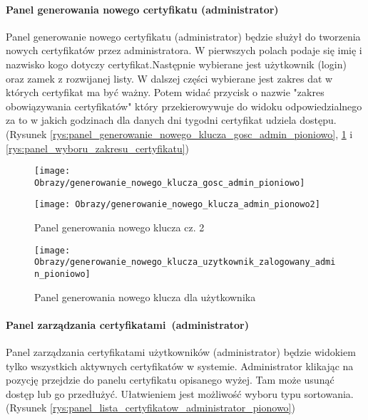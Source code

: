 	\paragraph*{Panel generowania nowego certyfikatu (administrator)}
	Panel generowanie nowego certyfikatu (administrator) będzie służył do tworzenia nowych certyfikatów przez administratora. W pierwszych polach podaje się imię i nazwisko kogo dotyczy certyfikat.Następnie wybierane jest użytkownik (login) oraz zamek z rozwijanej listy. W dalszej części wybierane jest zakres dat w których certyfikat ma być ważny. Potem widać przycisk o nazwie "zakres obowiązywania certyfikatów" który przekierowywuje do widoku odpowiedzialnego za to w jakich godzinach dla danych dni tygodni certyfikat udziela dostępu. (Rysunek \ref{rys:panel_generowanie_nowego_klucza_gosc_admin_pioniowo}, \ref{rys:panel_generowanie_nowego_klucza_admin_pionowo2} i 
	\ref{rys:panel_wyboru_zakresu_certyfikatu})
	
	\begin{figure}[ht!]
		\vspace{-0.5cm}
		\begin{minipage}{0.5\textwidth}
			\texttt{[image: Obrazy/generowanie\_nowego\_klucza\_gosc\_admin\_pioniowo]}
			\caption{Panel generowania nowego klucza cz. 1 }
			\label{rys:panel_generowanie_nowego_klucza_gosc_admin_pioniowo}
		\end{minipage}
		\hspace{0.5cm}
		\begin{minipage}{0.5\textwidth}
			\texttt{[image: Obrazy/generowanie\_nowego\_klucza\_admin\_pionowo2]}
			\caption{Panel generowania nowego klucza cz. 2}
			\label{rys:panel_generowanie_nowego_klucza_admin_pionowo2}	
		\end{minipage}
	\end{figure}
	\vspace{-0.5cm}
	\begin{figure}[ht!]
		\center
			\texttt{[image: Obrazy/generowanie\_nowego\_klucza\_uzytkownik\_zalogowany\_admin\_pioniowo]}
			\caption{Panel generowania nowego klucza dla użytkownika }
			\label{rys:panel_generowanie_nowego_klucza_uzytkownik_zalogowany_admin_pioniowo}
	\end{figure}

	
	\paragraph*{Panel zarządzania certyfikatami~(administrator)}
	Panel zarządzania certyfikatami użytkowników (administrator) będzie widokiem tylko wszystkich aktywnych certyfikatów w systemie. Administrator klikając na pozycję przejdzie do panelu certyfikatu opisanego wyżej. Tam może usunąć dostęp lub go przedłużyć. Ułatwieniem jest możliwość wyboru typu sortowania. (Rysunek \ref{rys:panel_lista_certyfikatow_administrator_pionowo})
	
